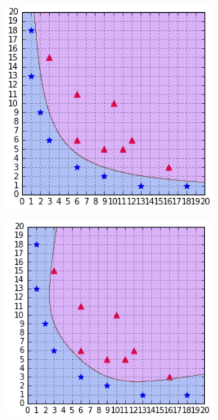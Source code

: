 \begin{itemize}
\begin{figure}[ht]
\begin{subfigure}{0.2\textwidth}
      \includegraphics[width=1\textwidth]{assets/svm/kernel__2.png}  
    \end{subfigure}\vspace*{1mm}
    \begin{subfigure}{0.21\textwidth}
      \centering
      \includegraphics[width=1\textwidth]{assets/svm/kernel__6.png}  

\end{subfigure}
\end{figure}
\end{itemize}
